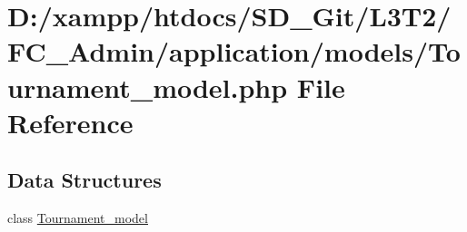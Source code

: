 \hypertarget{_tournament__model_8php}{}\section{D\+:/xampp/htdocs/\+S\+D\+\_\+\+Git/\+L3\+T2/\+F\+C\+\_\+\+Admin/application/models/\+Tournament\+\_\+model.php File Reference}
\label{_tournament__model_8php}
\subsection*{Data Structures}
\begin{DoxyCompactItemize}
\item 
class \hyperlink{class_tournament__model}{Tournament\+\_\+model}
\end{DoxyCompactItemize}
